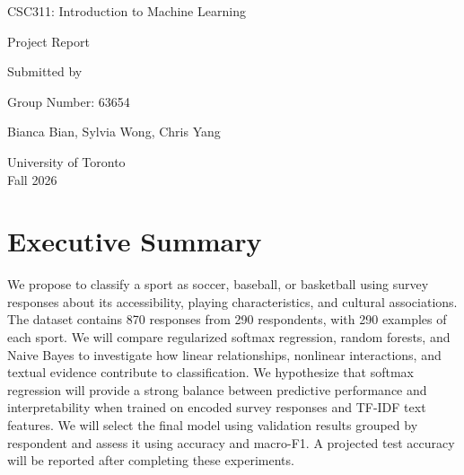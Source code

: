 \documentclass[12pt]{article}
\begin{document}
\begin{titlepage}
\centering
\vspace*{3cm}
{\Large {CSC311: Introduction to Machine Learning} \par}
\vspace{1cm}
{\Large {Project Report} \par}
\vspace{1cm}
\vspace{3cm}
{\large Submitted by \par}
\vspace{0.5cm}
{\large Group Number: 63654 \par}
\vspace{0.5cm}
{\large Bianca Bian, Sylvia Wong, Chris Yang \par}
\vfill
{\large University of Toronto \\ Fall 2026 \par}
\end{titlepage}
\clearpage
\setcounter{page}{1}
\section{Executive Summary}

We propose to classify a sport as soccer, baseball, or basketball using survey responses about its accessibility, playing characteristics, and cultural associations. The dataset contains 870 responses from 290 respondents, with 290 examples of each sport. We will compare regularized softmax regression, random forests, and Naive Bayes to investigate how linear relationships, nonlinear interactions, and textual evidence contribute to classification. We hypothesize that softmax regression will provide a strong balance between predictive performance and interpretability when trained on encoded survey responses and TF-IDF text features. We will select the final model using validation results grouped by respondent and assess it using accuracy and macro-F1. A projected test accuracy will be reported after completing these experiments.
\end{document}

